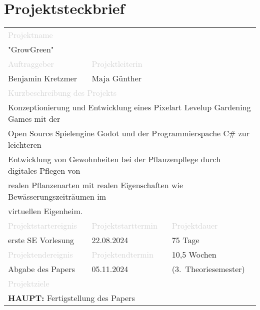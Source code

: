 \chapter{Projektsteckbrief}\label{ch:steckbrief}
\vspace{2cm}
\begin{table}[H]\label{tab:psPeople}
    \begin{tabular}{|l|l|l|}
        \hline
        \multicolumn{3}{|l|}{\footnotesize{\textcolor{lightgray}{Projektname}}}\\
        \multicolumn{3}{|l|}{"GrowGreen"}\\
        \hline
        \footnotesize{\textcolor{lightgray}{Auftraggeber}} & \multicolumn{2}{|l|}{\footnotesize{\textcolor{lightgray}{Projektleiterin}}}\\
        Benjamin Kretzmer & \multicolumn{2}{|l|}{Maja Günther}\\
        \hline
        \multicolumn{3}{|l|}{\footnotesize{\textcolor{lightgray}{Kurzbeschreibung des Projekts}}}\\
        \multicolumn{3}{|l|}{Konzeptionierung und Entwicklung eines Pixelart Levelup Gardening Games mit der}\\
        \multicolumn{3}{|l|}{Open Source Spielengine Godot und der Programmierspache C\# zur leichteren }\\
        \multicolumn{3}{|l|}{Entwicklung von Gewohnheiten bei der Pflanzenpflege durch digitales Pflegen von}\\
        \multicolumn{3}{|l|}{realen Pflanzenarten mit realen Eigenschaften wie Bewässerungszeiträumen im }\\
        \multicolumn{3}{|l|}{virtuellen Eigenheim.}\\
        \hline
        \footnotesize{\textcolor{lightgray}{Projektstartereignis}} & \footnotesize{\textcolor{lightgray}{Projektstarttermin}} & \footnotesize{\textcolor{lightgray}{Projektdauer}}\\
        erste SE Vorlesung & 22.08.2024 & 75 Tage\\
        \hline
        \footnotesize{\textcolor{lightgray}{Projektendereignis}} & \footnotesize{\textcolor{lightgray}{Projektendtermin}} & 10,5 Wochen\\
        Abgabe des Papers & 05.11.2024 & (3.\ Theoriesemester)\\
        \hline
        \multicolumn{3}{|l|}{\footnotesize{\textcolor{lightgray}{Projektziele}}}\\
        \multicolumn{3}{|l|}{\textbf{HAUPT:} Fertigstellung des Papers}\\

\end{tabular}
\end{table}
